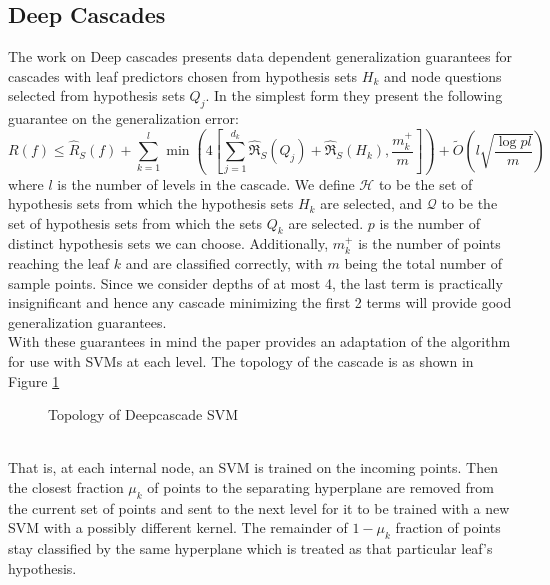 \documentclass[paper=letter, fontsize=11pt]{scrartcl}
\numberwithin{equation}{section}		%
\numberwithin{figure}{section}			%
\numberwithin{table}{section}				%
\begin{document}
\subsection{Deep Cascades}
The work on Deep cascades presents data dependent generalization guarantees for cascades with leaf predictors chosen from hypothesis sets $H_k$ and node questions selected from hypothesis sets $Q_j$. In the simplest form they present the following guarantee on the generalization error:
\begin{equation}
R(f) \leq \widehat{R}_S(f) + \sum_{k=1}^{l} \min \left( 4\left[ \sum_{j=1}^{d_k} \widehat{\mathfrak{R}}_S(Q_j) + \widehat{\mathfrak{R}}_S(H_k), \frac{m_k^+}{m} \right] \right)	 + \widetilde{O} \left( l \sqrt{\frac{\log pl}{m}} \right)
\label{dcbound}
\end{equation}
where $l$ is the number of levels in the cascade. We define $\mathcal{H}$ to be the set of hypothesis sets from which the hypothesis sets $H_k$ are selected, and $\mathcal{Q}$ to be the set of hypothesis sets from which the sets $Q_k$ are selected. $p$ is the number of distinct hypothesis sets we can choose. Additionally, $m_k^+$ is the number of points reaching the leaf $k$ and are classified correctly, with $m$ being the total number of sample points. Since we consider depths of at most 4, the last term is practically insignificant and hence any cascade minimizing the first 2 terms will provide good generalization guarantees.
\\With these guarantees in mind the paper provides an adaptation of the algorithm for use with SVMs at each level. The topology of the cascade is as shown in Figure \ref{topology}
\begin{figure}[h]
\centering
{\footnotesize
{}
}
\caption{Topology of Deepcascade SVM}
\label{topology}
\end{figure}
\\That is, at each internal node, an SVM is trained on the incoming points. Then the closest fraction $\mu_k$ of points to the separating hyperplane are removed from the current set of points and sent to the next level for it to be trained with a new SVM with a possibly different kernel. The remainder of $1-\mu_k$ fraction of points stay classified by the same hyperplane which is treated as that particular leaf's hypothesis.
\end{document}
